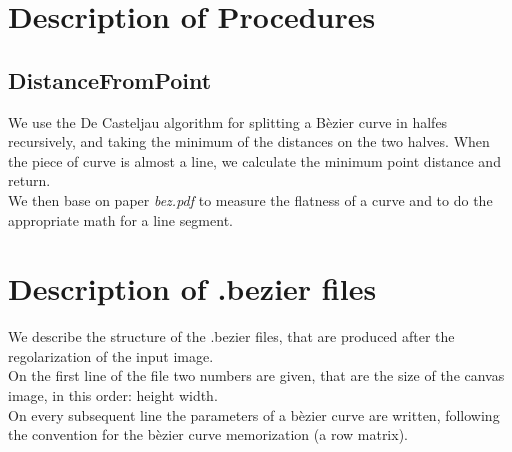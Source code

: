 \documentclass[a4paper,NoNotes,GeneralMath]{stdmdoc}
\begin{document}
	\section*{Description of Procedures}
	\subsection*{DistanceFromPoint}
	We use the De Casteljau algorithm for splitting a Bèzier curve in halfes recursively, and taking the minimum of the
	distances on the two halves. When the piece of curve is almost a line, we calculate the minimum point distance and return. \\
	We then base on paper {\it bez.pdf} to measure the flatness of a curve and to do the appropriate math for a line segment.

	\section*{Description of .bezier files}
	We describe the structure of the .bezier files, that are produced after the regolarization of the input image. \\
	On the first line of the file two numbers are given, that are the size of the canvas image, in this order: height width. \\
	On every subsequent line the parameters of a bèzier curve are written, following the convention for the bèzier curve memorization (a row matrix). \\
	
\end{document}
